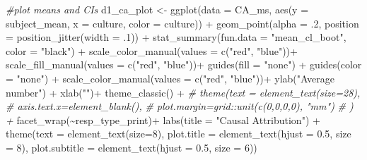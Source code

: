 \documentclass[
]{article}
\newenvironment{Shaded}{\begin{snugshade}}{\end{snugshade}}
\newcommand{\AttributeTok}[1]{\textcolor[rgb]{0.77,0.63,0.00}{#1}}
\newcommand{\CommentTok}[1]{\textcolor[rgb]{0.56,0.35,0.01}{\textit{#1}}}
\newcommand{\DecValTok}[1]{\textcolor[rgb]{0.00,0.00,0.81}{#1}}
\newcommand{\FloatTok}[1]{\textcolor[rgb]{0.00,0.00,0.81}{#1}}
\newcommand{\FunctionTok}[1]{\textcolor[rgb]{0.00,0.00,0.00}{#1}}
\newcommand{\NormalTok}[1]{#1}
\newcommand{\OtherTok}[1]{\textcolor[rgb]{0.56,0.35,0.01}{#1}}
\newcommand{\SpecialCharTok}[1]{\textcolor[rgb]{0.00,0.00,0.00}{#1}}
\newcommand{\StringTok}[1]{\textcolor[rgb]{0.31,0.60,0.02}{#1}}
\begin{document}
\begin{Shaded}
\begin{Highlighting}[]
\CommentTok{\#plot means and CIs}
\NormalTok{d1\_ca\_plot }\OtherTok{\textless{}{-}} \FunctionTok{ggplot}\NormalTok{(}\AttributeTok{data =}\NormalTok{ CA\_ms, }
       \FunctionTok{aes}\NormalTok{(}\AttributeTok{y =}\NormalTok{ subject\_mean, }\AttributeTok{x =}\NormalTok{ culture, }\AttributeTok{color =}\NormalTok{ culture)) }\SpecialCharTok{+}
\FunctionTok{geom\_point}\NormalTok{(}\AttributeTok{alpha =}\NormalTok{ .}\DecValTok{2}\NormalTok{, }\AttributeTok{position =} \FunctionTok{position\_jitter}\NormalTok{(}\AttributeTok{width =}\NormalTok{ .}\DecValTok{1}\NormalTok{)) }\SpecialCharTok{+} 
                    \FunctionTok{stat\_summary}\NormalTok{(}\AttributeTok{fun.data =} \StringTok{"mean\_cl\_boot"}\NormalTok{, }\AttributeTok{color =} \StringTok{"black"}\NormalTok{)  }\SpecialCharTok{+}
\FunctionTok{scale\_color\_manual}\NormalTok{(}\AttributeTok{values =} \FunctionTok{c}\NormalTok{(}\StringTok{"red"}\NormalTok{, }\StringTok{"blue"}\NormalTok{))}\SpecialCharTok{+}
\FunctionTok{scale\_fill\_manual}\NormalTok{(}\AttributeTok{values =} \FunctionTok{c}\NormalTok{(}\StringTok{"red"}\NormalTok{, }\StringTok{"blue"}\NormalTok{))}\SpecialCharTok{+}
\FunctionTok{guides}\NormalTok{(}\AttributeTok{fill =} \StringTok{"none"}\NormalTok{) }\SpecialCharTok{+}
\FunctionTok{guides}\NormalTok{(}\AttributeTok{color =} \StringTok{"none"}\NormalTok{) }\SpecialCharTok{+}
\FunctionTok{scale\_color\_manual}\NormalTok{(}\AttributeTok{values =} \FunctionTok{c}\NormalTok{(}\StringTok{"red"}\NormalTok{, }\StringTok{"blue"}\NormalTok{))}\SpecialCharTok{+}
\FunctionTok{ylab}\NormalTok{(}\StringTok{"Average number"}\NormalTok{) }\SpecialCharTok{+} 
\FunctionTok{xlab}\NormalTok{(}\StringTok{""}\NormalTok{)}\SpecialCharTok{+}
\FunctionTok{theme\_classic}\NormalTok{() }\SpecialCharTok{+}
\CommentTok{\#   theme(text = element\_text(size=28), }
\CommentTok{\#         axis.text.x=element\_blank(), }
\CommentTok{\#         plot.margin=grid::unit(c(0,0,0,0), "mm")}
\CommentTok{\#         )  + }
  \FunctionTok{facet\_wrap}\NormalTok{(}\SpecialCharTok{\textasciitilde{}}\NormalTok{resp\_type\_print)}\SpecialCharTok{+}
  \FunctionTok{labs}\NormalTok{(}\AttributeTok{title =} \StringTok{"Causal Attribution"}\NormalTok{) }\SpecialCharTok{+}
\FunctionTok{theme}\NormalTok{(}\AttributeTok{text =} \FunctionTok{element\_text}\NormalTok{(}\AttributeTok{size=}\DecValTok{8}\NormalTok{),}
      \AttributeTok{plot.title =} \FunctionTok{element\_text}\NormalTok{(}\AttributeTok{hjust =} \FloatTok{0.5}\NormalTok{, }\AttributeTok{size =} \DecValTok{8}\NormalTok{), }
      \AttributeTok{plot.subtitle =} \FunctionTok{element\_text}\NormalTok{(}\AttributeTok{hjust =} \FloatTok{0.5}\NormalTok{, }\AttributeTok{size =} \DecValTok{6}\NormalTok{))  }
\end{Highlighting}
\end{Shaded}
\end{document}
